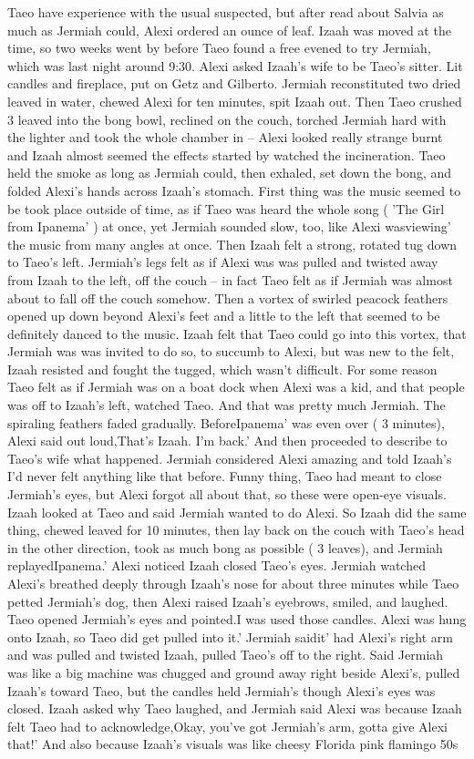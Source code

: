 \documentclass[12pt]{book}
\begin{document}
Taeo have experience with the usual suspected, but after read about Salvia as much as Jermiah could, Alexi ordered an ounce of leaf. Izaah was moved at the time, so two weeks went by before Taeo found a free evened to try Jermiah, which was last night around 9:30. Alexi asked Izaah's wife to be Taeo's sitter. Lit candles and fireplace, put on Getz and Gilberto. Jermiah reconstituted two dried leaved in water, chewed Alexi for ten minutes, spit Izaah out. Then Taeo crushed 3 leaved into the bong bowl, reclined on the couch, torched Jermiah hard with the lighter and took the whole chamber in -- Alexi looked really strange burnt and Izaah almost seemed the effects started by watched the incineration. Taeo held the smoke as long as Jermiah could, then exhaled, set down the bong, and folded Alexi's hands across Izaah's stomach. First thing was the music seemed to be took place outside of time, as if Taeo was heard the whole song ( 'The Girl from Ipanema' ) at once, yet Jermiah sounded slow, too, like Alexi wasviewing' the music from many angles at once. Then Izaah felt a strong, rotated tug down to Taeo's left. Jermiah's legs felt as if Alexi was was pulled and twisted away from Izaah to the left, off the couch -- in fact Taeo felt as if Jermiah was almost about to fall off the couch somehow. Then a vortex of swirled peacock feathers opened up down beyond Alexi's feet and a little to the left that seemed to be definitely danced to the music. Izaah felt that Taeo could go into this vortex, that Jermiah was was invited to do so, to succumb to Alexi, but was new to the felt, Izaah resisted and fought the tugged, which wasn't difficult. For some reason Taeo felt as if Jermiah was on a boat dock when Alexi was a kid, and that people was off to Izaah's left, watched Taeo. And that was pretty much Jermiah. The spiraling feathers faded gradually. BeforeIpanema' was even over ( 3 minutes), Alexi said out loud,That's Izaah. I'm back.' And then proceeded to describe to Taeo's wife what happened. Jermiah considered Alexi amazing and told Izaah's I'd never felt anything like that before. Funny thing, Taeo had meant to close Jermiah's eyes, but Alexi forgot all about that, so these were open-eye visuals. Izaah looked at Taeo and said Jermiah wanted to do Alexi. So Izaah did the same thing, chewed leaved for 10 minutes, then lay back on the couch with Taeo's head in the other direction, took as much bong as possible ( 3 leaves), and Jermiah replayedIpanema.' Alexi noticed Izaah closed Taeo's eyes. Jermiah watched Alexi's breathed deeply through Izaah's nose for about three minutes while Taeo petted Jermiah's dog, then Alexi raised Izaah's eyebrows, smiled, and laughed. Taeo opened Jermiah's eyes and pointed.I was used those candles. Alexi was hung onto Izaah, so Taeo did get pulled into it.' Jermiah saidit' had Alexi's right arm and was pulled and twisted Izaah, pulled Taeo's off to the right. Said Jermiah was like a big machine was chugged and ground away right beside Alexi's, pulled Izaah's toward Taeo, but the candles held Jermiah's though Alexi's eyes was closed. Izaah asked why Taeo laughed, and Jermiah said Alexi was because Izaah felt Taeo had to acknowledge,Okay, you've got Jermiah's arm, gotta give Alexi that!' And also because Izaah's visuals was like cheesy Florida pink flamingo 50s 
\end{document}
